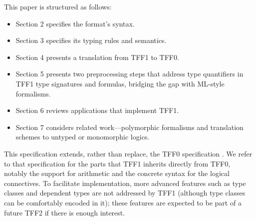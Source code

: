 This paper is structured as follows:
\begin{itemize}
\item Section 2 specifies the format's syntax.
\item Section 3 specifies its typing rules and semantics.
\item Section 4 presents a translation from TFF1 to TFF0.
\item Section 5 presents two preprocessing steps that address type quantifiers
in TFF1 type signatures and formulas, bridging the gap with ML-style
formalisms. %
\item Section 6 reviews applications that implement TFF1.
\item Section 7 considers related work---polymorphic formalisms and translation
schemes to untyped or monomorphic logics.
\end{itemize}

This specification extends, rather than replace, the TFF0 specification
\cite{sutcliffe-et-al-2011-tff0}. We refer to that specification for the parts
that TFF1 inherits directly from TFF0, notably the support for arithmetic and
the concrete syntax for the logical connectives.
%
To facilitate implementation, more advanced features such as type classes and
dependent types are not addressed by TFF1 (although type classes can be
comfortably encoded in it); these features are expected to be part of a
future TFF2 if there is enough interest.
